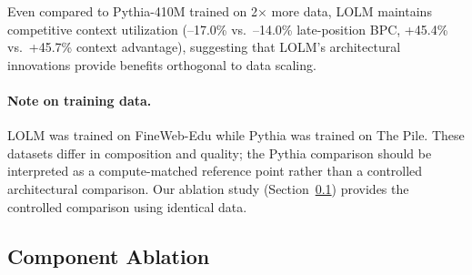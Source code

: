 \documentclass{article}
\begin{document}
Even compared to Pythia-410M trained on 2$\times$ more data, LOLM maintains
competitive context utilization (--17.0\% vs.\ --14.0\% late-position BPC,
+45.4\% vs.\ +45.7\% context advantage), suggesting that LOLM's architectural
innovations provide benefits orthogonal to data scaling.

\paragraph{Note on training data.} LOLM was trained on FineWeb-Edu while Pythia
was trained on The Pile. These datasets differ in composition and quality;
the Pythia comparison should be interpreted as a compute-matched reference
point rather than a controlled architectural comparison. Our ablation study
(Section~\ref{sec:ablation}) provides the controlled comparison using identical
data.

\subsection{Component Ablation}
\label{sec:ablation}
\end{document}
